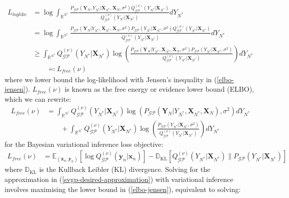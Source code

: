 \documentclass{article}
\newcommand{\KLD}{\operatorname{\mathbb{D}_{KL}}}
\newcommand{\GP}{\operatorname{\mathcal{GP}}}
\numberwithin{equation}{section}
\begin{document}
\begin{align}
     L_{loglike} &= \log \int_{\mathbb{R}^{N^*}} \frac{P_{\GP}\left(\mathbf{Y}_N, Y_{N^*} \vert \mathbf{X}_{N^*}, \mathbf{X}_N, \sigma^2\right) Q^{(\nu)}_{\GP}(Y_{N^*} \vert \mathbf{X}_{N^*})}{Q^{(\nu)}_{\GP}(Y_{N^*} \vert \mathbf{X}_{N^*})} d Y_{N^*}
     \\ &= \log \int_{\mathbb{R}^{N^*}} \frac{P_{\GP}\left(\mathbf{Y}_N \vert Y_{N^*},  \mathbf{X}_{N^*}, \mathbf{X}_N, \sigma^2\right) P_{\GP}\left( Y_{N^*} \vert \mathbf{X}_{N^*}, \sigma^2\right) Q^{(\nu)}_{\GP}(Y_{N^*} \vert \mathbf{X}_{N^*})}{Q^{(\nu)}_{\GP}(Y_{N^*} \vert \mathbf{X}_{N^*})} d Y_{N^*}
     \\ & \geq \int_{\mathbb{R}^{N^*}} Q^{(\nu)}_{\GP}(Y_{N^*} \vert \mathbf{X}_{N^*}) \log \left(\frac{P_{\GP}\left(\mathbf{Y}_N \vert Y_{N^*},  \mathbf{X}_{N^*}, \mathbf{X}_N, \sigma^2\right) P_{\GP}\left( Y_{N^*} \vert \mathbf{X}_{N^*}, \sigma^2\right) }{Q^{(\nu)}_{\GP}(Y_{N^*} \vert \mathbf{X}_{N^*})}\right) d Y_{N^*}
     \label{elbo-jensen}
     \\ & \qquad \eqqcolon L_{free}(\nu)
     \label{elbo-definition}
\end{align}
where we lower bound the log-likelihood with Jensen's inequality in (\ref{elbo-jensen}). $L_{free}(\nu)$ is known as the free energy or evidence lower bound (ELBO), which we can rewrite:
\begin{align}
    L_{free}(\nu) &= \int_{\mathbb{R}^{N^*}} Q^{(\nu)}_{\GP}(Y_{N^*} \vert \mathbf{X}_{N^*}) \log \left(P_{\GP}\left(\mathbf{Y}_N \vert Y_{N^*},  \mathbf{X}_{N^*}, \mathbf{X}_N\right), \sigma^2\right) d Y_{N^*} \nonumber
    \\ & \qquad + \int_{\mathbb{R}^{N^*}} Q^{(\nu)}_{\GP}(Y_{N^*} \vert \mathbf{X}_{N^*}) \log \left(\frac{P_{\GP}\left( Y_{N^*} \vert \mathbf{X}_{N^*}, \sigma^2\right) }{Q^{(\nu)}_{\GP}(Y_{N^*} \vert \mathbf{X}_{N^*})}\right) d Y_{N^*}
    \label{elbo-broken-down}
\end{align}
for the Bayesian variational inference loss objective:
\begin{align}
    L_{free}(\nu) &=\mathbb{E}_{(\mathbf{x}_n, \mathbf{y}_n)}\left[ \log Q^{(\nu)}_{\GP}(\mathbf{y}_n \vert \mathbf{x}_n)\right] - \KLD \left[ Q^{(\nu)}_{\GP}(Y_{N^*} \vert \mathbf{X}_{N^*}) \| P_{\GP}\left( Y_{N^*} \vert \mathbf{X}_{N^*}\right) \right]
    \label{bvi-loss}
\end{align}
where $\KLD$ is the Kullback Leibler (KL) divergence.
Solving for the approximation in (\ref{svgp-desired-approximation}) with variational inference involves maximising the lower bound in (\ref{elbo-jensen}), equivalent to solving:
\end{document}
